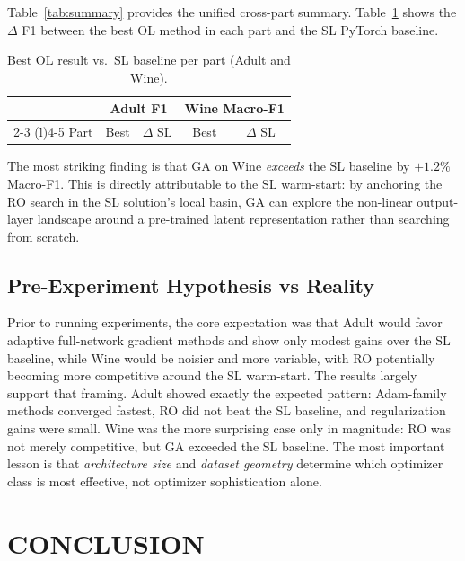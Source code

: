 \documentclass[letterpaper, 10 pt, conference]{ieeeconf}
\begin{document}
Table~\ref{tab:summary} provides the unified cross-part summary. Table~\ref{tab:sl_comparison} shows the $\Delta$ F1 between the best OL method in each part and the SL PyTorch baseline.

\begin{table}[!htbp]
    \centering
    \caption{Best OL result vs.\ SL baseline per part (Adult and Wine).}
    \label{tab:sl_comparison}
    \setlength{\tabcolsep}{3pt}
    \begin{tabular}{@{}lcccc@{}}
    \toprule
    & \multicolumn{2}{c}{\textbf{Adult F1}} & \multicolumn{2}{c}{\textbf{Wine Macro-F1}} \\
    \cmidrule(lr){2-3} \cmidrule(l){4-5}
    Part & Best & $\Delta$ SL & Best & $\Delta$ SL \\
    \midrule
    
    \bottomrule
    \end{tabular}
\end{table}

The most striking finding is that GA on Wine \emph{exceeds} the SL baseline by $+1.2\%$ Macro-F1. This is directly attributable to the SL warm-start: by anchoring the RO search in the SL solution's local basin, GA can explore the non-linear output-layer landscape around a pre-trained latent representation rather than searching from scratch.

\subsection{Pre-Experiment Hypothesis vs Reality}

Prior to running experiments, the core expectation was that Adult would favor adaptive full-network gradient methods and show only modest gains over the SL baseline, while Wine would be noisier and more variable, with RO potentially becoming more competitive around the SL warm-start. The results largely support that framing. Adult showed exactly the expected pattern: Adam-family methods converged fastest, RO did not beat the SL baseline, and regularization gains were small. Wine was the more surprising case only in magnitude: RO was not merely competitive, but GA exceeded the SL baseline. The most important lesson is that \emph{architecture size} and \emph{dataset geometry} determine which optimizer class is most effective, not optimizer sophistication alone.

\section{CONCLUSION}
\end{document}
